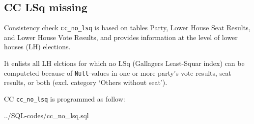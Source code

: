 \subsection{CC LSq missing}\label{cc_no_lsq}
Consistency check \texttt{\footnotesize cc\_no\_lsq} is based on tables Party, Lower House Seat Results, and Lower House Vote Results, and provides information at the level of lower houses (LH) elections. 

It enlists all LH elctions for which no LSq (Gallagers Least-Squar index) can be computeted because of \texttt{\footnotesize  Null}-values in one or more party's vote results, seat results, or both (excl. category `Others without seat').

CC \texttt{\footnotesize cc\_no\_lsq} is programmed as follow: 

%
{../SQL-codes/cc_no_lsq.sql}
